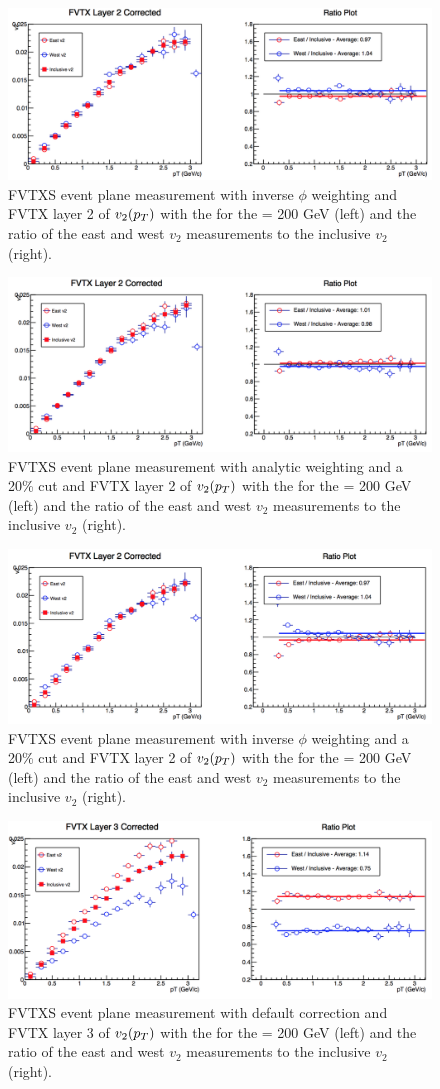 \begin{figure}
\includegraphics[width=0.65\linewidth]{figs/fvtx_2_data.png}
\caption{FVTXS event plane measurement with inverse $\phi$ weighting and FVTX layer 2 of $v_{2}(\mbox{$p_T$})$ with the  for the \pau \sqsn = 200 GeV (left) and the ratio of the east and west $v_2$ measurements to the inclusive $v_2$ (right).}
\end{figure}

\begin{figure}
\includegraphics[width=0.65\linewidth]{figs/fvtx_2_analytic.png}
\caption{FVTXS event plane measurement with analytic weighting and a 20\% cut and FVTX layer 2 of $v_{2}(\mbox{$p_T$})$ with the  for the \pau \sqsn = 200 GeV (left) and the ratio of the east and west $v_2$ measurements to the inclusive $v_2$ (right).}
\end{figure}

\begin{figure}
\includegraphics[width=0.65\linewidth]{figs/fvtx_2_data_cut.png}
\caption{FVTXS event plane measurement with inverse $\phi$ weighting and a 20\% cut and FVTX layer 2 of $v_{2}(\mbox{$p_T$})$ with the  for the \pau \sqsn = 200 GeV (left) and the ratio of the east and west $v_2$ measurements to the inclusive $v_2$ (right).}
\end{figure}

\begin{figure}
\includegraphics[width=0.65\linewidth]{figs/fvtx_3_default.png}
\caption{FVTXS event plane measurement with default correction and FVTX layer 3 of $v_{2}(\mbox{$p_T$})$ with the  for the \pau \sqsn = 200 GeV (left) and the ratio of the east and west $v_2$ measurements to the inclusive $v_2$ (right).}
\end{figure}

